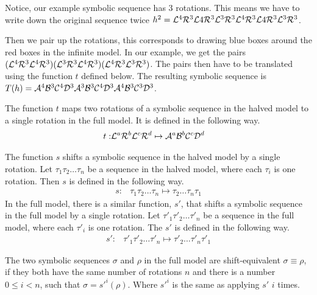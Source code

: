 Notice, our example symbolic sequence has 3 rotations.
This means we have to write down the original sequence twice $h^2 = \mathcal{L}^4\mathcal{R}^3\mathcal{L}4\mathcal{R}^3\mathcal{L}^3\mathcal{R}^3\mathcal{L}^4\mathcal{R}^3\mathcal{L}4\mathcal{R}^3\mathcal{L}^3\mathcal{R}^3$.

Then we pair up the rotations, this corresponds to drawing blue boxes around the red boxes in the infinite model.
In our example, we get the pairs $(\mathcal{L}^4\mathcal{R}^3\mathcal{L}^4\mathcal{R}^3)(\mathcal{L}^3\mathcal{R}^3\mathcal{L}^4\mathcal{R}^3)(\mathcal{L}^4\mathcal{R}^3\mathcal{L}^3\mathcal{R}^3)$.
The pairs then have to be translated using the function $t$ defined below.
The resulting symbolic sequence is $T(h) = \mathcal{A}^4\mathcal{B}^3\mathcal{C}^4\mathcal{D}^3\mathcal{A}^3\mathcal{B}^3\mathcal{C}^4\mathcal{D}^3\mathcal{A}^4\mathcal{B}^3\mathcal{C}^3\mathcal{D}^3$.

\begin{definition}
    The function $t$ maps two rotations of a symbolic sequence in the halved model to a single rotation in the full model.
    It is defined in the following way.
    \begin{align}
        t: & \mathcal{L}^a\mathcal{R}^b\mathcal{L}^c\mathcal{R}^d \mapsto \mathcal{A}^a\mathcal{B}^b\mathcal{C}^c\mathcal{D}^d
    \end{align}
\end{definition}

\begin{definition}
    The function $s$ shifts a symbolic sequence in the halved model by a single rotation.
    Let $\tau_1\tau_2 \dots \tau_n$ be a sequence in the halved model, where each $\tau_i$ is one rotation.
    Then $s$ is defined in the following way.
    \begin{align}
        s: & \tau_1\tau_2 \dots \tau_n \mapsto \tau_2 \dots \tau_n\tau_1
    \end{align}
    In the full model, there is a similar function, $s'$, that shifts a symbolic sequence in the full model by a single rotation.
    Let $\tau'_1\tau'_2 \dots \tau'_n$ be a sequence in the full model, where each $\tau'_i$ is one rotation.
    The $s'$ is defined in the following way.
    \begin{align}
        s': & \tau'_1\tau'_2 \dots \tau'_n \mapsto \tau'_2 \dots \tau'_n\tau'_1
    \end{align}
\end{definition}

\begin{definition}
    The two symbolic sequences $\sigma$ and $\rho$ in the full model are shift-equivalent $\sigma \equiv \rho$,
    if they both have the same number of rotations $n$
    and there is a number $0 \leq i < n$, such that $\sigma = s'^i(\rho)$.
    Where $s'^i$ is the same as applying $s'$ $i$ times.
\end{definition}

